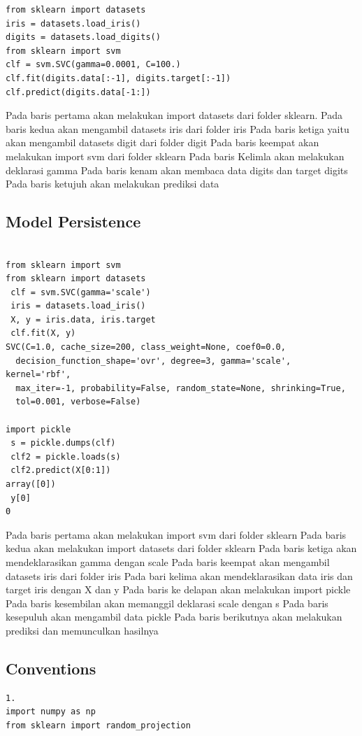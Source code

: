 \begin{enumerate}
\begin{verbatim}
from sklearn import datasets
iris = datasets.load_iris()
digits = datasets.load_digits()
from sklearn import svm
clf = svm.SVC(gamma=0.0001, C=100.)
clf.fit(digits.data[:-1], digits.target[:-1])
clf.predict(digits.data[-1:])

\end{verbatim}
\subitem
Pada baris pertama akan melakukan import datasets dari folder sklearn.
Pada baris kedua akan mengambil datasets iris dari folder iris
Pada baris ketiga yaitu akan mengambil datasets digit dari folder digit
Pada baris keempat akan melakukan import svm dari folder sklearn
Pada baris Kelimla akan melakukan deklarasi gamma
Pada baris kenam akan membaca data digits dan target digits
Pada baris ketujuh akan melakukan prediksi data

\subsection{ Model Persistence}

\begin{verbatim}

from sklearn import svm
from sklearn import datasets
 clf = svm.SVC(gamma='scale')
 iris = datasets.load_iris()
 X, y = iris.data, iris.target
 clf.fit(X, y)  
SVC(C=1.0, cache_size=200, class_weight=None, coef0=0.0,
  decision_function_shape='ovr', degree=3, gamma='scale', kernel='rbf',
  max_iter=-1, probability=False, random_state=None, shrinking=True,
  tol=0.001, verbose=False)

import pickle
 s = pickle.dumps(clf)
 clf2 = pickle.loads(s)
 clf2.predict(X[0:1])
array([0])
 y[0]
0

\end{verbatim}
\subitem
Pada baris pertama akan melakukan import svm dari folder sklearn
Pada baris kedua akan melakukan import datasets dari folder sklearn
Pada baris ketiga akan mendeklarasikan gamma dengan scale
Pada baris keempat akan mengambil datasets iris dari folder iris
Pada bari kelima akan mendeklarasikan data iris dan target iris dengan X dan y
Pada baris ke delapan akan melakukan import pickle
Pada baris kesembilan akan memanggil deklarasi scale dengan s
Pada baris kesepuluh akan mengambil data pickle
Pada baris berikutnya akan melakukan prediksi dan memunculkan hasilnya

\subsection{Conventions}
\begin{verbatim}
1.
import numpy as np
from sklearn import random_projection


\end{verbatim}
\end{enumerate}
